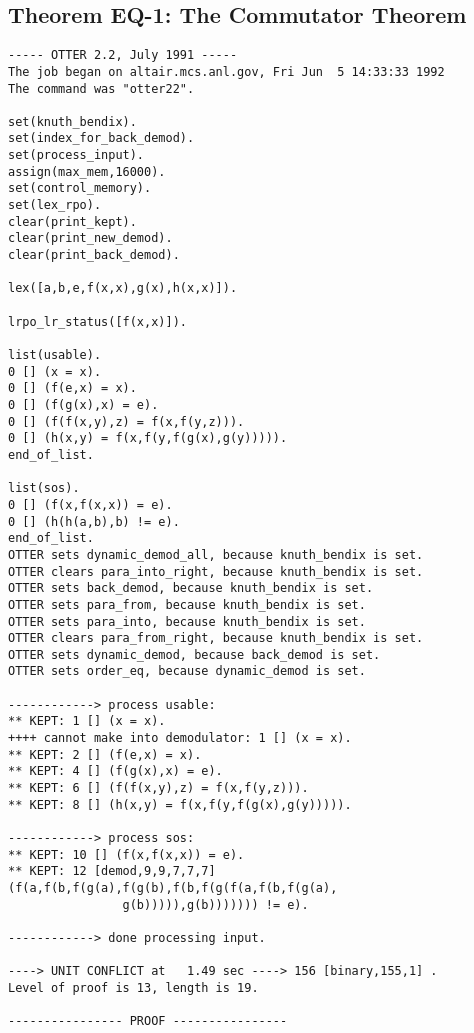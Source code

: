 \subsection{Theorem EQ-1: The Commutator Theorem}
{\small \begin{verbatim}
----- OTTER 2.2, July 1991 -----
The job began on altair.mcs.anl.gov, Fri Jun  5 14:33:33 1992
The command was "otter22".

set(knuth_bendix).
set(index_for_back_demod).
set(process_input).
assign(max_mem,16000).
set(control_memory).
set(lex_rpo).
clear(print_kept).
clear(print_new_demod).
clear(print_back_demod).

lex([a,b,e,f(x,x),g(x),h(x,x)]).

lrpo_lr_status([f(x,x)]).

list(usable).
0 [] (x = x).
0 [] (f(e,x) = x).
0 [] (f(g(x),x) = e).
0 [] (f(f(x,y),z) = f(x,f(y,z))).
0 [] (h(x,y) = f(x,f(y,f(g(x),g(y))))).
end_of_list.

list(sos).
0 [] (f(x,f(x,x)) = e).
0 [] (h(h(a,b),b) != e).
end_of_list.
OTTER sets dynamic_demod_all, because knuth_bendix is set.
OTTER clears para_into_right, because knuth_bendix is set.
OTTER sets back_demod, because knuth_bendix is set.
OTTER sets para_from, because knuth_bendix is set.
OTTER sets para_into, because knuth_bendix is set.
OTTER clears para_from_right, because knuth_bendix is set.
OTTER sets dynamic_demod, because back_demod is set.
OTTER sets order_eq, because dynamic_demod is set.

------------> process usable:
** KEPT: 1 [] (x = x).
++++ cannot make into demodulator: 1 [] (x = x).
** KEPT: 2 [] (f(e,x) = x).
** KEPT: 4 [] (f(g(x),x) = e).
** KEPT: 6 [] (f(f(x,y),z) = f(x,f(y,z))).
** KEPT: 8 [] (h(x,y) = f(x,f(y,f(g(x),g(y))))).

------------> process sos:
** KEPT: 10 [] (f(x,f(x,x)) = e).
** KEPT: 12 [demod,9,9,7,7,7] (f(a,f(b,f(g(a),f(g(b),f(b,f(g(f(a,f(b,f(g(a),
                g(b))))),g(b))))))) != e).

------------> done processing input.

----> UNIT CONFLICT at   1.49 sec ----> 156 [binary,155,1] .
Level of proof is 13, length is 19.

---------------- PROOF ----------------


\end{verbatim}}
